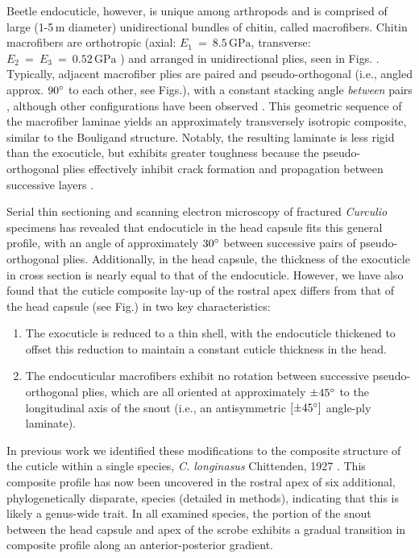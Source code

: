 \documentclass[twocolumn, linenumbers, superscriptaddress]{revtex4-1}
\begin{document}
		Beetle endocuticle, however, is unique among arthropods and is comprised of large (1-5\,{\textmu}m diameter) unidirectional bundles of chitin, called macrofibers.
		Chitin macrofibers are orthotropic (axial: $E_1~=~8.5\,\text{GPa}$, transverse: $ E_2~=~E_3~=~0.52\,\text{GPa}$ \cite{Jansen2016}) and arranged in unidirectional plies, seen in Figs.  \cite{Kamp2010,Kamp2015}.
		Typically, adjacent macrofiber plies are paired and pseudo-orthogonal (i.e., angled approx. $90\degree$ to each other, see Figs.), with a constant stacking angle \emph{between} pairs , although other configurations have been observed \cite{Hepburn1973,Kamp2010}.
		This geometric sequence of the macrofiber laminae yields an approximately transversely isotropic composite, similar to the Bouligand structure.
		Notably, the resulting laminate is less rigid than the exocuticle, but exhibits greater toughness because the pseudo-orthogonal plies effectively inhibit crack formation and propagation between successive layers \cite{Kamp2010,Kamp2015,Hepburn1973}.
		
		Serial thin sectioning and scanning electron microscopy of fractured \textit{Curculio} specimens has revealed that endocuticle in the head capsule fits this general profile, with an angle of approximately $30\degree$ between successive pairs of pseudo-orthogonal plies.
		Additionally, in the head capsule, the thickness of the exocuticle in cross section is nearly equal to that of the endocuticle.
		However, we have also found that the cuticle composite lay-up of the rostral apex differs from that of the head capsule (see Fig.) in two key characteristics:

		\begin{enumerate}
			\item The exocuticle is reduced to a thin shell, with the endocuticle thickened  to offset this reduction to maintain a constant cuticle thickness in the head.
			\item The endocuticular macrofibers exhibit no rotation between successive pseudo-orthogonal plies, which are all oriented at approximately $\pm45\degree$ to the longitudinal axis of the snout (i.e., an antisymmetric $[\pm45\degree]$ angle-ply laminate).
		\end{enumerate}
		
		In previous work we identified these modifications to the composite structure of the cuticle within a single species, \textit{C. longinasus} Chittenden, 1927 \cite{Jansen2016, Singh2016}.
		This composite profile has now been uncovered in the rostral apex of six additional, phylogenetically disparate, species (detailed in methods), indicating that this is likely a genus-wide trait.
		In all examined species, the portion of the snout between the head capsule and apex of the scrobe exhibits a gradual transition in composite profile along an anterior-posterior gradient.
		
\end{document}
